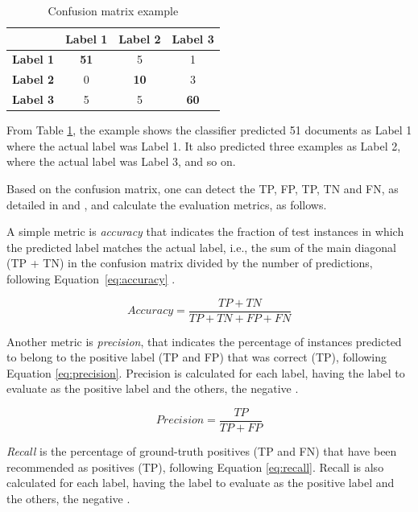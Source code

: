 
\begin{table}[htb]
\centering
\caption{Confusion matrix example}
\label{tab:confusion_matrix}
\footnotesize
\begin{tabular}{@{}cccc@{}}
\toprule
 & \textbf{Label 1} & \textbf{Label 2} & \textbf{Label 3}  \\ \midrule
\textbf{Label 1} & \textbf{51} & 5 & 1  \\
\textbf{Label 2} & 0 & \textbf{10} & 3  \\
\textbf{Label 3} & 5 & 5 & \textbf{60}  \\ \bottomrule
\end{tabular}
\end{table}

From Table \ref{tab:confusion_matrix}, the example shows the classifier predicted 51 documents as Label 1 where the  actual   label was Label 1. It also predicted three examples as Label 2, where the actual label was Label 3, and so on.

Based on the confusion matrix, one can detect the \gls{TP}, \gls{FP}, \gls{TP}, \gls{TN} and \gls{FN}, as detailed in  \textcite{Kowsari2019} and \textcite{Lever2016}, and calculate the evaluation metrics, as follows.


A simple metric is \textit{accuracy} that indicates the fraction of test instances in which the predicted label matches the actual label, i.e., the sum  of the main diagonal (\gls{TP} + \gls{TN}) in the confusion matrix divided by the number of predictions, following Equation~\ref{eq:accuracy} \cite{Lever2016}.
    
    \begin{equation}
        Accuracy = \frac{TP+TN}{TP+TN+FP+FN}\label{eq:accuracy}
    \end{equation}
    
Another metric is \textit{precision}, that indicates the percentage of instances predicted to belong to the positive label (\gls{TP} and \gls{FP}) that was correct (\gls{TP}), following Equation \ref{eq:precision}. Precision is calculated for each label, having the label to evaluate as the positive label and the others, the negative  \cite{Lever2016}.
    
    \begin{equation}
        Precision = \frac{TP}{TP+FP}\label{eq:precision}
    \end{equation}
    
 \textit{Recall} is the percentage of ground-truth positives (\gls{TP} and \gls{FN}) that have been recommended as positives (\gls{TP}), following Equation \ref{eq:recall}. Recall is also calculated for each label, having the label to evaluate as the positive label and the others, the negative  \cite{Lever2016}.
    
